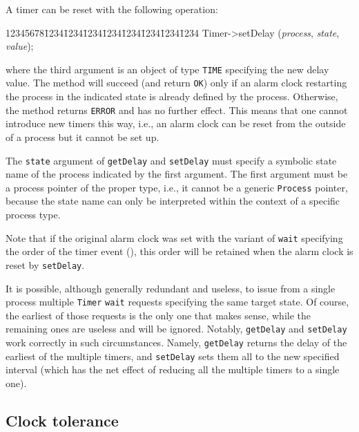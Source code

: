 A timer can be reset with the following operation:
{\tt\begin{tabbing}
12345678\=1234\=1234\=1234\=1234\=1234\=1234\=1234\=1234\kill
\>Timer->setDelay ({\em process}, {\em state}, {\em value\/});
\end{tabbing}}
\noindent
where the third argument is an object of type {\tt TIME} specifying the
new delay value.
The method will succeed (and return {\tt OK}) only if an alarm clock restarting
the process in the indicated state is already defined by the process.
Otherwise, the method returns {\tt ERROR} and has no further effect.
This means that one cannot introduce new timers this way, i.e., an alarm clock
can be reset from the outside of a process but it cannot be set up.

The {\tt state} argument of {\tt getDelay} and {\tt setDelay} must
specify a symbolic state name of the process indicated by the first
argument.
The first argument must be a process pointer of the proper type, i.e.,
it cannot be a generic {\tt Process} pointer, because the state name
can only be interpreted within the context of a specific process type.

Note that if the original alarm clock was set with the variant of {\tt wait}
specifying the order of the timer event (), this order will
be retained when the alarm clock is reset by {\tt setDelay}.

It is possible, although generally redundant and useless,
to issue from a single process multiple {\tt Timer} {\tt wait}
requests specifying the same target state.
Of course, the earliest of those requests is the only one that makes
sense, while the remaining ones are useless and will be ignored.
Notably, {\tt getDelay} and {\tt setDelay} work correctly in such
circumstances.
Namely, {\tt getDelay} returns the delay of the earliest of the multiple
timers, and {\tt setDelay} sets them all to the new specified interval (which
has the net effect of reducing all the multiple timers to a single one).

\subsection{Clock tolerance}
\label{rm_ti_to}

